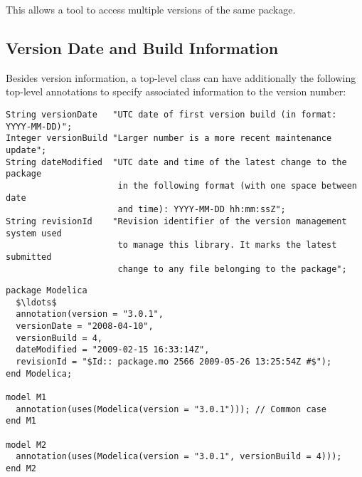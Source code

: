 This allows a tool to access multiple versions of the same package.

\subsection{Version Date and Build Information}\label{version-date-and-build-information}

Besides version information, a top-level class can have additionally the following top-level annotations to specify associated information to the version number:%
\begin{lstlisting}[language=modelica]
String versionDate   "UTC date of first version build (in format: YYYY-MM-DD)";
Integer versionBuild "Larger number is a more recent maintenance update";
String dateModified  "UTC date and time of the latest change to the package
                      in the following format (with one space between date
                      and time): YYYY-MM-DD hh:mm:ssZ";
String revisionId    "Revision identifier of the version management system used
                      to manage this library. It marks the latest submitted
                      change to any file belonging to the package";
\end{lstlisting}%

\begin{example}
\begin{lstlisting}[language=modelica,mathescape=false]
package Modelica
  $\ldots$
  annotation(version = "3.0.1",
  versionDate = "2008-04-10",
  versionBuild = 4,
  dateModified = "2009-02-15 16:33:14Z",
  revisionId = "$Id:: package.mo 2566 2009-05-26 13:25:54Z #$");
end Modelica;

model M1
  annotation(uses(Modelica(version = "3.0.1"))); // Common case
end M1

model M2
  annotation(uses(Modelica(version = "3.0.1", versionBuild = 4)));
end M2
\end{lstlisting}
\end{example}

